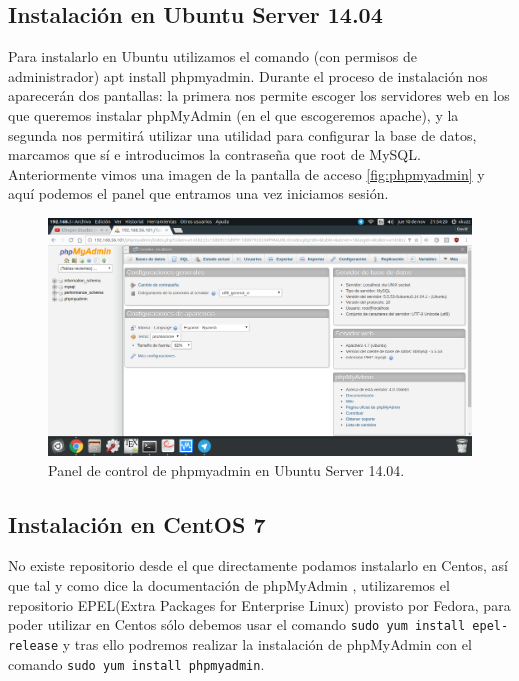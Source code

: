 \begin{flushleft}
\subsection{Instalación en Ubuntu Server 14.04}
Para instalarlo en Ubuntu \cite{c13a} utilizamos el comando (con permisos de administrador) apt install phpmyadmin. Durante el proceso de instalación nos aparecerán dos pantallas: la primera nos permite escoger los servidores web en los que queremos instalar phpMyAdmin (en el que escogeremos apache), y la segunda nos permitirá utilizar una utilidad para configurar la base de datos, marcamos que sí e introducimos la contraseña que root de MySQL.
\linebreak
Anteriormente vimos una imagen de la pantalla de acceso \ref{fig:phpmyadmin} y aquí podemos el panel que entramos una vez iniciamos sesión.
\begin{figure}[H]
	\centering
	\includegraphics[scale=0.3]{phpmyadmin2.png}
	\caption{Panel de control de phpmyadmin en Ubuntu Server 14.04.}
\end{figure}

\subsection{Instalación en CentOS 7}
No existe repositorio desde el que directamente podamos instalarlo en Centos, así que tal y como dice la documentación de phpMyAdmin \cite{c13a-c}, utilizaremos el repositorio EPEL(Extra Packages for Enterprise Linux) provisto por Fedora, para poder utilizar en Centos sólo debemos usar el comando \verb|sudo yum install epel-release| y tras ello podremos realizar la instalación de phpMyAdmin con el comando \verb|sudo yum install phpmyadmin|.


\end{flushleft}
